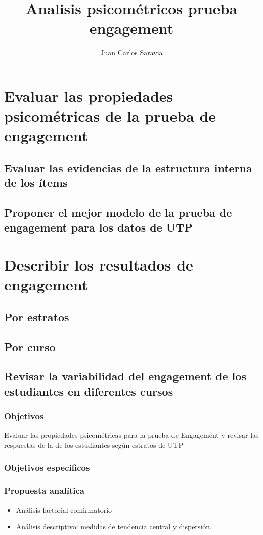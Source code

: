 \documentclass{beamer}
\title{Analisis psicométricos prueba engagement}
\author{Juan Carlos Saravia}
\begin{document}
\begin{frame}
\titlepage
\end{frame}


\section{Evaluar las propiedades psicométricas de la prueba de engagement}
\subsection{Evaluar las evidencias de la estructura interna de los ítems}
\subsection{Proponer el mejor modelo de la prueba de engagement para los datos de UTP}

\section{Describir los resultados de engagement}
\subsection{Por estratos}
\subsection{Por curso}
\subsection{Revisar la variabilidad del engagement de los estudiantes en diferentes cursos}


\begin{frame}
\frametitle{Objetivos}
Evaluar las propiedades psicométricas para la prueba de Engagement y revisar las respuestas de la de los estudiantes según estratos de UTP
\end{frame}



\begin{frame}
\frametitle{Objetivos especificos}
\tableofcontents
\end{frame}

\begin{frame}
\frametitle{Propuesta analítica}

\begin{itemize}
\item Análisis factorial confirmatorio	
\item Análisis descriptivo: medidas de tendencia central y dispersión. 
\end{itemize}	

\end{frame}
\end{document}
